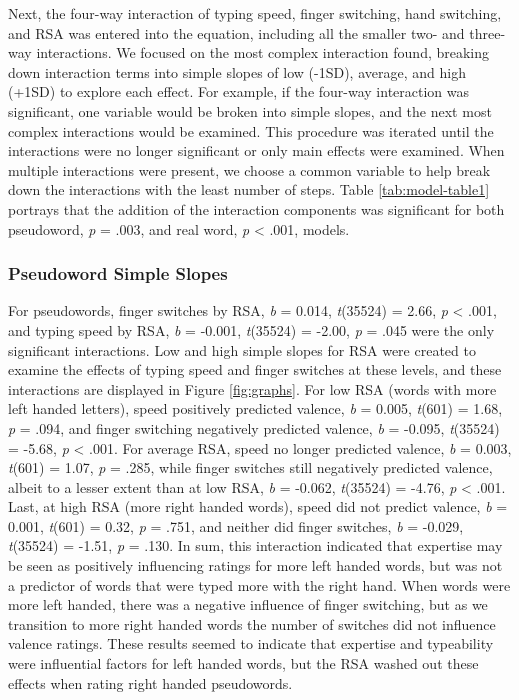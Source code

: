 \documentclass[
  english,
  man]{apa7}
\begin{document}
Next, the four-way interaction of typing speed, finger switching, hand switching, and RSA was entered into the equation, including all the smaller two- and three-way interactions. We focused on the most complex interaction found, breaking down interaction terms into simple slopes of low (-1SD), average, and high (+1SD) to explore each effect. For example, if the four-way interaction was significant, one variable would be broken into simple slopes, and the next most complex interactions would be examined. This procedure was iterated until the interactions were no longer significant or only main effects were examined. When multiple interactions were present, we choose a common variable to help break down the interactions with the least number of steps. Table \ref{tab:model-table1} portrays that the addition of the interaction components was significant for both pseudoword, \emph{p} = .003, and real word, \emph{p} \textless{} .001, models.

\hypertarget{pseudoword-simple-slopes}{%
\subsubsection{Pseudoword Simple Slopes}\label{pseudoword-simple-slopes}}

For pseudowords, finger switches by RSA, \emph{b} = 0.014, \emph{t}(35524) = 2.66, \emph{p} \textless{} .001, and typing speed by RSA, \emph{b} = -0.001, \emph{t}(35524) = -2.00, \emph{p} = .045 were the only significant interactions. Low and high simple slopes for RSA were created to examine the effects of typing speed and finger switches at these levels, and these interactions are displayed in Figure \ref{fig:graphs}. For low RSA (words with more left handed letters), speed positively predicted valence, \emph{b} = 0.005, \emph{t}(601) = 1.68, \emph{p} = .094, and finger switching negatively predicted valence, \emph{b} = -0.095, \emph{t}(35524) = -5.68, \emph{p} \textless{} .001. For average RSA, speed no longer predicted valence, \emph{b} = 0.003, \emph{t}(601) = 1.07, \emph{p} = .285, while finger switches still negatively predicted valence, albeit to a lesser extent than at low RSA, \emph{b} = -0.062, \emph{t}(35524) = -4.76, \emph{p} \textless{} .001. Last, at high RSA (more right handed words), speed did not predict valence, \emph{b} = 0.001, \emph{t}(601) = 0.32, \emph{p} = .751, and neither did finger switches, \emph{b} = -0.029, \emph{t}(35524) = -1.51, \emph{p} = .130. In sum, this interaction indicated that expertise may be seen as positively influencing ratings for more left handed words, but was not a predictor of words that were typed more with the right hand. When words were more left handed, there was a negative influence of finger switching, but as we transition to more right handed words the number of switches did not influence valence ratings. These results seemed to indicate that expertise and typeability were influential factors for left handed words, but the RSA washed out these effects when rating right handed pseudowords.
\end{document}
